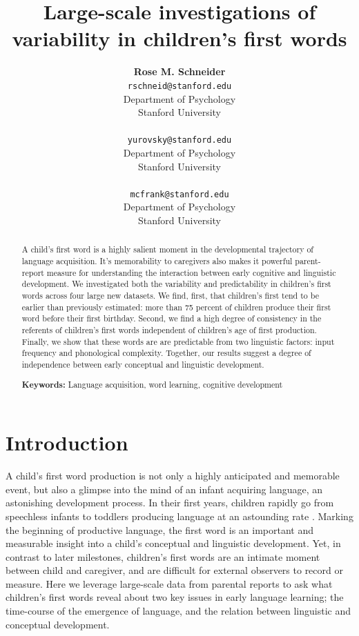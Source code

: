 \documentclass[10pt,letterpaper]{article}
\title{Large-scale investigations of variability in children's first words}
\author{{\large \bf Rose M. Schneider} \\ \texttt{rschneid@stanford.edu}\\ Department of Psychology \\ Stanford University \\ 
\And {\large \bf Daniel Yurovsky} \\ \texttt{yurovsky@stanford.edu} \\ Department of Psychology \\ Stanford University \\ 
\And {\large \bf Michael C. Frank} \\ \texttt{mcfrank@stanford.edu} \\ Department of Psychology \\ Stanford University \\ }
\begin{document}
\maketitle


\begin{abstract}
A child's first word is a highly salient moment in the developmental trajectory of language acquisition. It's memorability to caregivers also makes it powerful parent-report measure for understanding the interaction between early cognitive and linguistic development. We investigated both the variability and predictability in children's first words across four large new datasets. We find, first, that children's first tend to be earlier than previously estimated: more than 75 percent of children produce their first word before their first birthday. Second, we find a high degree of consistency in the referents of children's first words independent of children's age of first production. Finally, we show that these words are are predictable from two linguistic factors: input frequency and phonological complexity. Together, our results suggest a degree of independence between early conceptual and linguistic development.

\textbf{Keywords:}
Language acquisition, word learning, cognitive development
\end{abstract}

\section{Introduction}

A child's first word production is not only a highly anticipated and memorable event, but also a glimpse into the mind of an infant acquiring language, an astonishing development process. In their first years, children rapidly go from speechless infants to toddlers producing language at an astounding rate \cite{fenson1994,bloom2002}. Marking the beginning of productive language, the first word is an important and measurable insight into a child's conceptual and linguistic development. Yet, in contrast to later milestones, children's first words are an intimate moment between child and caregiver, and are difficult for external observers to record or measure. Here we leverage large-scale data from parental reports to ask what children's first words reveal about two key issues in early language learning; the time-course of the emergence of language, and the relation between linguistic and conceptual development. 
\end{document}
